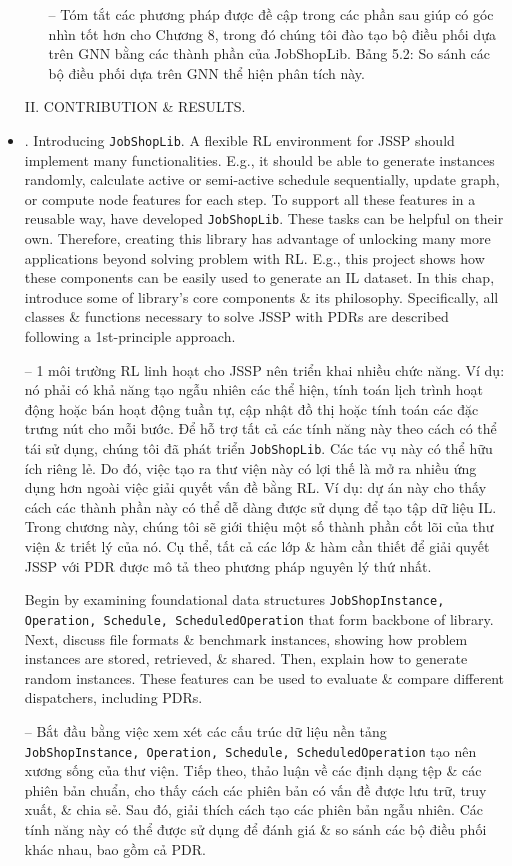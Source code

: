 \documentclass{article}
\begin{document}
\begin{itemize}
\begin{itemize}
        -- Tóm tắt các phương pháp được đề cập trong các phần sau giúp có góc nhìn tốt hơn cho Chương 8, trong đó chúng tôi đào tạo bộ điều phối dựa trên GNN bằng các thành phần của JobShopLib. {\sf Bảng 5.2: So sánh các bộ điều phối dựa trên GNN} thể hiện phân tích này.
    \end{itemize}
    II. CONTRIBUTION \& RESULTS.
    \item {. Introducing {\tt JobShopLib}.} A flexible RL environment for JSSP should implement many functionalities. E.g., it should be able to generate instances randomly, calculate active or semi-active schedule sequentially, update graph, or compute node features for each step. To support all these features in a reusable way, have developed {\tt JobShopLib}. These tasks can be helpful on their own. Therefore, creating this library has advantage of unlocking many more applications beyond solving problem with RL. E.g., this project shows how these components can be easily used to generate an IL dataset. In this chap, introduce some of library's core components \& its philosophy. Specifically, all classes \& functions necessary to solve JSSP with PDRs are described following a 1st-principle approach.

    -- 1 môi trường RL linh hoạt cho JSSP nên triển khai nhiều chức năng. Ví dụ: nó phải có khả năng tạo ngẫu nhiên các thể hiện, tính toán lịch trình hoạt động hoặc bán hoạt động tuần tự, cập nhật đồ thị hoặc tính toán các đặc trưng nút cho mỗi bước. Để hỗ trợ tất cả các tính năng này theo cách có thể tái sử dụng, chúng tôi đã phát triển {\tt JobShopLib}. Các tác vụ này có thể hữu ích riêng lẻ. Do đó, việc tạo ra thư viện này có lợi thế là mở ra nhiều ứng dụng hơn ngoài việc giải quyết vấn đề bằng RL. Ví dụ: dự án này cho thấy cách các thành phần này có thể dễ dàng được sử dụng để tạo tập dữ liệu IL. Trong chương này, chúng tôi sẽ giới thiệu một số thành phần cốt lõi của thư viện \& triết lý của nó. Cụ thể, tất cả các lớp \& hàm cần thiết để giải quyết JSSP với PDR được mô tả theo phương pháp nguyên lý thứ nhất.

    Begin by examining foundational data structures {\tt JobShopInstance, Operation, Schedule, ScheduledOperation} that form backbone of library. Next, discuss file formats \& benchmark instances, showing how problem instances are stored, retrieved, \& shared. Then, explain how to generate random instances. These features can be used to evaluate \& compare different dispatchers, including PDRs.

    -- Bắt đầu bằng việc xem xét các cấu trúc dữ liệu nền tảng {\tt JobShopInstance, Operation, Schedule, ScheduledOperation} tạo nên xương sống của thư viện. Tiếp theo, thảo luận về các định dạng tệp \& các phiên bản chuẩn, cho thấy cách các phiên bản có vấn đề được lưu trữ, truy xuất, \& chia sẻ. Sau đó, giải thích cách tạo các phiên bản ngẫu nhiên. Các tính năng này có thể được sử dụng để đánh giá \& so sánh các bộ điều phối khác nhau, bao gồm cả PDR.


\end{itemize}
\end{document}
